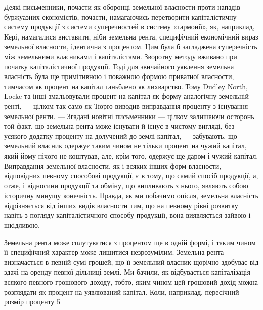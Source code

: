 Деякі письменники, почасти як оборонці земельної власности проти нападів
буржуазних економістів, почасти, намагаючись перетворити капіталістичну систему продукції з системи
суперечностей в систему «гармонії», як, наприклад,
Кері, намагалися виставити, ніби земельна рента, специфічний економічний
вираз земельної власности, ідентична з процентом. Цим була б загладжена суперечність між земельними
власниками і капіталістами. Зворотну методу вживано при початку капіталістичної продукції. Тоді для
звичайного уявлення земельна власність була ще примітивною і поважною формою приватної власности,
тимчасом
як процент на капітал ганьблено як лихварство. Тому Dudley North, Locke
та інші змальовували процент на капітал як форму аналогічну земельній
ренті, — цілком так само як Тюрґо виводив виправдання проценту з існування
земельної ренти. — Згадані новітні письменники — цілком залишаючи осторонь той факт, що земельна
рента може існувати й існує в чистому вигляді,
без усякого додатку проценту на долучений до землі капітал, — забувають, що
земельний власник одержує таким чином не тільки процент на чужий капітал,
який йому нічого не коштував, але, крім того, одержує ще даром і чужий
капітал. Виправдання земельної власности, як і всяких інших форм власности,
відповідних певному способові продукції, є в тому, що самий спосіб продукції,
а, отже, і відносини продукції та обміну, що випливають з нього, являють собою
історичну минущу конечність. Правда, як ми побачимо опісля, земельна власність
відрізняється від інших видів власности тим, що на певному рівні розвитку
навіть з погляду капіталістичного способу продукції, вона виявляється зайвою
і шкідливою.

Земельна рента може сплутуватися з процентом ще в одній формі, і таким чином її специфічний характер
може лишитися незрозумілим. Земельна
рента визначається в певній сумі грошей, що її земельний власник щорічно здобуває від здачі на
оренду певної дільниці землі. Ми бачили, як відбувається
капіталізація всякого певного грошового доходу, тобто, яким чином
цей грошовий дохід можна розглядати як процент на уявлюваний капітал.
Коли, наприклад, пересічний розмір проценту 5%
